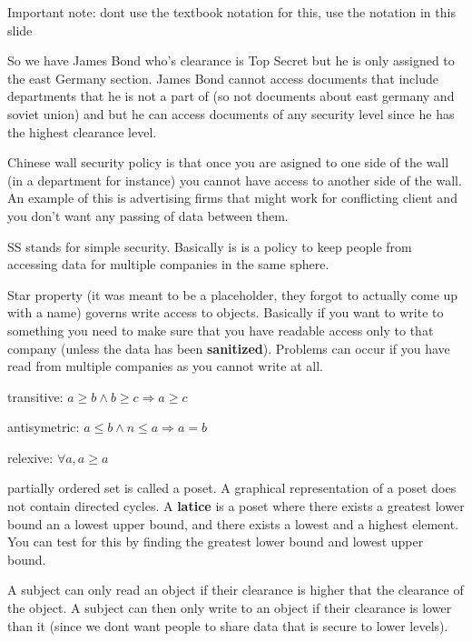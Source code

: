 \documentclass{article}
\begin{document}
\begin{itemizeP}



Important note: dont use the textbook notation for this, use the notation in this slide


So we have James Bond who's clearance is Top Secret but he is only assigned to the east Germany section. James Bond cannot access documents that include departments that he is not a part of (so not documents about east germany and soviet union) and but he can access documents of any security level since he has the highest clearance level.




Chinese wall security policy is that once you are asigned to one side of the wall (in a department for instance) you cannot have access to another side of the wall. An example of this is advertising firms that might work for conflicting client and you don't want any passing of data between them.

SS stands for simple security. Basically is is a policy to keep people from accessing data for multiple companies in the same sphere.

Star property (it was meant to be a placeholder, they forgot to actually come up with a name) governs write access to objects. Basically if you want to write to something you need to make sure that you have readable access only to that company (unless the data has been \textbf{sanitized}). Problems can occur if you have read from multiple companies as you cannot write at all.




transitive: 	$a \ge b \wedge b \ge c \Rightarrow a \ge c$

antisymetric: 	$a \le b \wedge n \le a \Rightarrow a = b$

relexive: 		$\forall a, a \ge a$

partially ordered set is called a poset. A graphical representation of a poset does not contain directed cycles. A \textbf{latice} is a poset where there exists a greatest lower bound an a lowest upper bound, and there exists a lowest and a highest element. You can test for this by finding the greatest lower bound and lowest upper bound. 



A subject can only read an object if their clearance is higher that the clearance of the object. A subject can then only write to an object if their clearance is lower than it (since we dont want people to share data that is secure to lower levels).


\end{itemizeP}
\end{document}
